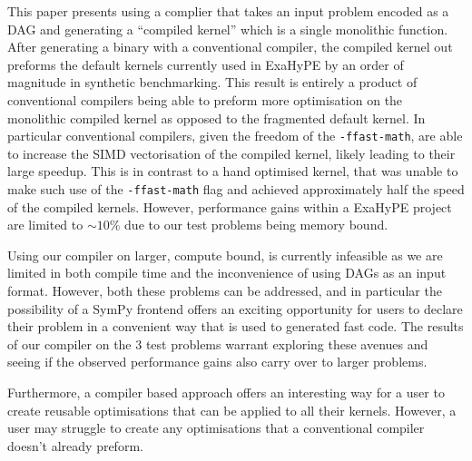 This paper presents using a complier that takes an input problem encoded as a DAG and generating a ``compiled kernel'' which is a single monolithic function.
After generating a binary with a conventional compiler, the compiled kernel out preforms the default kernels currently used in ExaHyPE by an order of magnitude in synthetic benchmarking.
This result is entirely a product of conventional compilers being able to preform more optimisation on the monolithic compiled kernel as opposed to the fragmented default kernel.
In particular conventional compilers, given the freedom of the \texttt{-ffast-math}, are able to increase the SIMD vectorisation of the compiled kernel, likely leading to their large speedup.
This is in contrast to a hand optimised kernel, that was unable to make such use of the \texttt{-ffast-math} flag and achieved approximately half the speed of the compiled kernels.
However, performance gains within a ExaHyPE project are limited to $\sim 10\%$ due to our test problems being memory bound.

Using our compiler on larger, compute bound, is currently infeasible as we are limited in both compile time and the inconvenience of using DAGs as an input format.
However, both these problems can be addressed, and in particular the possibility of a SymPy frontend offers an exciting opportunity for users to declare their problem in a convenient way that is used to generated fast code. 
The results of our compiler on the 3 test problems warrant exploring these avenues and seeing if the observed performance gains also carry over to larger problems.

Furthermore, a compiler based approach offers an interesting way for a user to create reusable optimisations that can be applied to all their kernels.
However, a user may struggle to create any optimisations that a conventional compiler doesn't already preform.


